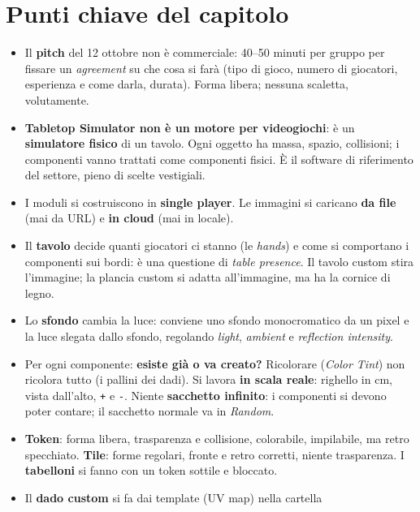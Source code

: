 \section*{Punti chiave del capitolo}

\begin{itemize}
  \item Il \textbf{pitch} del 12 ottobre non è commerciale: 40--50 minuti per gruppo
        per fissare un \emph{agreement} su che cosa si farà (tipo di gioco, numero di
        giocatori, esperienza e come darla, durata). Forma libera; nessuna scaletta,
        volutamente.
  \item \textbf{Tabletop Simulator non è un motore per videogiochi}: è un
        \textbf{simulatore fisico} di un tavolo. Ogni oggetto ha massa, spazio,
        collisioni; i componenti vanno trattati come componenti fisici. È il software
        di riferimento del settore, pieno di scelte vestigiali.
  \item I moduli si costruiscono in \textbf{single player}. Le immagini si caricano
        \textbf{da file} (mai da URL) e \textbf{in cloud} (mai in locale).
  \item Il \textbf{tavolo} decide quanti giocatori ci stanno (le \emph{hands}) e come
        si comportano i componenti sui bordi: è una questione di \emph{table presence}.
        Il tavolo custom stira l'immagine; la plancia custom si adatta all'immagine,
        ma ha la cornice di legno.
  \item Lo \textbf{sfondo} cambia la luce: conviene uno sfondo monocromatico da un
        pixel e la luce slegata dallo sfondo, regolando \emph{light}, \emph{ambient}
        e \emph{reflection intensity}.
  \item Per ogni componente: \textbf{esiste già o va creato?} Ricolorare
        (\emph{Color Tint}) non ricolora tutto (i pallini dei dadi). Si lavora
        \textbf{in scala reale}: righello in cm, vista dall'alto, \texttt{+} e
        \texttt{-}. Niente \textbf{sacchetto infinito}: i componenti si devono poter
        contare; il sacchetto normale va in \emph{Random}.
  \item \textbf{Token}: forma libera, trasparenza e collisione, colorabile, impilabile,
        ma retro specchiato. \textbf{Tile}: forme regolari, fronte e retro corretti,
        niente trasparenza. I \textbf{tabelloni} si fanno con un token sottile e
        bloccato.
  \item Il \textbf{dado custom} si fa dai template (UV map) nella cartella

\end{itemize}
